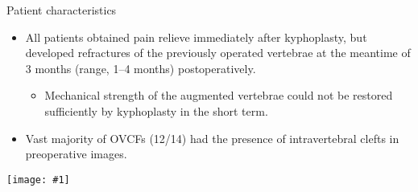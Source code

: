 \documentclass{beamer}
\newcommand*{\solo}[1]{\centering\texttt{[image: \#1]}}
\begin{document}
\begin{frame}{Patient characteristics}
    \begin{itemize}
        \item All patients obtained pain relieve immediately after kyphoplasty,
              but developed refractures of the previously operated vertebrae at
              the meantime of 3 months (range, 1--4 months) postoperatively.
            \begin{itemize}
                \item Mechanical strength of the augmented vertebrae could not
                      be restored sufficiently by kyphoplasty in the short term.
            \end{itemize}
        \item Vast majority of OVCFs (12/14) had the presence of intravertebral
              clefts in preoperative images.
    \end{itemize}
\end{frame}

\begin{frame}{}
    \solo{F4.jpg}
\end{frame}
\end{document}
